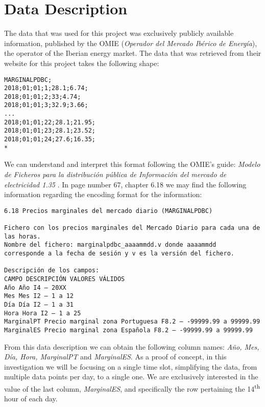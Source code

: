 \documentclass[12pt]{report} %
\begin{document}
\section{Data Description} %
The data that was used for this project was exclusively publicly available information, published by the OMIE (\textit{Operador del Mercado Ibérico de Energía}), the operator of the Iberian energy market. The data that was retrieved from their website \cite{omie_datos} for this project takes the following shape:

\begin{small}
\begin{verbatim}
MARGINALPDBC;
2018;01;01;1;28.1;6.74;
2018;01;01;2;33;4.74;
2018;01;01;3;32.9;3.66;
...
2018;01;01;22;28.1;21.95;
2018;01;01;23;28.1;23.52;
2018;01;01;24;27.6;16.35;
*
\end{verbatim}
\end{small}

We can understand and interpret this format following the OMIE's guide: \textit{Modelo de Ficheros para la distribución pública de Información del mercado de electricidad 1.35} \cite{omie_formatos_2024}. In page number 67, chapter 6.18 we may find the following information regarding the encoding format for the information:

\begin{small} %
\begin{verbatim}
6.18 Precios marginales del mercado diario (MARGINALPDBC)

Fichero con los precios marginales del Mercado Diario para cada una de
las horas.
Nombre del fichero: marginalpdbc_aaaammdd.v donde aaaammdd
corresponde a la fecha de sesión y v es la versión del fichero.

Descripción de los campos:
CAMPO DESCRIPCIÓN VALORES VÁLIDOS
Año Año I4 – 20XX
Mes Mes I2 – 1 a 12
Día Día I2 – 1 a 31
Hora Hora I2 – 1 a 25
MarginalPT Precio marginal zona Portuguesa F8.2 – -99999.99 a 99999.99
MarginalES Precio marginal zona Española F8.2 – -99999.99 a 99999.99
\end{verbatim}
\end{small}

From this data description we can obtain the following column names: \textit{Año, Mes, Día, Hora, MarginalPT} and \textit{MarginalES}. As a proof of concept, in this investigation we will be focusing on a single time slot, simplifying the data, from multiple data points per day, to a single one. We are exclusively interested in the value of the last column, \textit{MarginalES}, and specifically the row pertaining the 14\textsuperscript{th} hour of each day.
\end{document}
